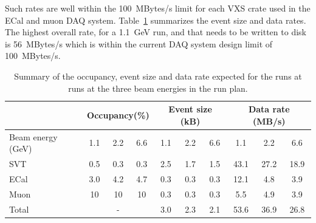  Such rates are well within the 100~MBytes/s limit for each VXS crate used in the ECal and muon 
DAQ system.
Table~\ref{tab:data_rates} summarizes the event size and data rates. The highest overall rate, for a 1.1~GeV run, and that needs to be written to disk is 56~MBytes/s which is within the current 
DAQ system design limit of 100~MBytes/s. 
\begin{table}[]
\centering
\begin{tabular}{|l|ccc|ccc|ccc|}
\hline
 & \multicolumn{3}{|c|}{Occupancy(\%)} &  \multicolumn{3}{|c|}{Event size (kB)} &  \multicolumn{3}{|c|}{Data rate (MB/s)} \\
\hline
Beam energy (GeV) & 1.1 & 2.2 & 6.6 & 1.1 & 2.2 & 6.6 & 1.1 & 2.2 & 6.6 \\
\hline
SVT & 0.5 & 0.3  & 0.3  & 2.5 & 1.7 & 1.5 & 43.1 & 27.2 & 18.9\\
ECal & 3.0 & 4.2  & 4.7 & 0.3 & 0.3  & 0.3 & 12.1 & 4.8  & 3.9 \\
Muon & 10 &  10 & 10  & 0.3 & 0.3 & 0.3 & 5.5 & 4.9 & 3.9 \\
\hline
Total& \multicolumn{3}{|c|}{-} & 3.0 & 2.3 & 2.1 & 53.6 & 36.9 & 26.8 \\
\hline
\end{tabular}
\caption{{\small Summary of the occupancy, event size and data rate expected for the runs at  runs at the three beam 
energies in the run plan. }}
\label{tab:data_rates}
\end{table}
